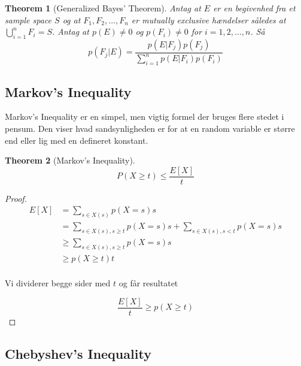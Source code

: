 \documentclass[11pt]{article}
\newtheorem{theorem}{Theorem}
\theoremstyle{definition}
\theoremstyle{remark}
\begin{document}
\begin{theorem}[Generalized Bayes' Theorem]
  Antag at $E$ er en begivenhed fra et sample space $S$ og at $F_1, F_{2}, \ldots, F_{n}$ er mutually exclusive hændelser således at $\bigcup\limits_{i=1}^{n}F_{i} = S$. Antag at $p(E) \neq 0$ og $p(F_{i}) \neq 0$ for $i= 1, 2, \ldots, n$. Så
  \[
p(F_{j}|E) = \frac{p(E|F_{j}) p(F_{j})}{\sum_{i=1}^{n}p(E|F_{i})p(F_{i})}
  \]
\end{theorem}


\subsection{Markov's Inequality}
\label{subsec:label}

Markov's Inequality er en simpel, men vigtig formel der bruges flere stedet i pensum. Den viser hvad sandsynligheden er for at en random variable er større end eller lig med en defineret konstant.

\begin{theorem}[Markov's Inequality]
 \[ 
P(X \geq t) \leq \frac{E[X]}{t}
\]
\end{theorem}

\begin{proof}
\begin{equation}
\begin{split}
  E[X] &= \sum_{s \in X(s)}^{} p(X=s)s\\
       &= \sum_{s \in X(s), s \geq t}^{} p(X=s)s + \sum_{s \in X(s), s < t}^{} p(X=s)s \\
       &\geq \sum_{s \in X(s), s \geq t}^{} p(X=s)s \\
       &\geq p(X\geq t)t\\
\end{split}
\end{equation}

Vi dividerer begge sider med $t$ og får resultatet

\[
\frac{E[X]}{t} \geq p(X \geq t)
\]


\end{proof}

\subsection{Chebyshev's Inequality}
\label{subsec:label}
\end{document}
